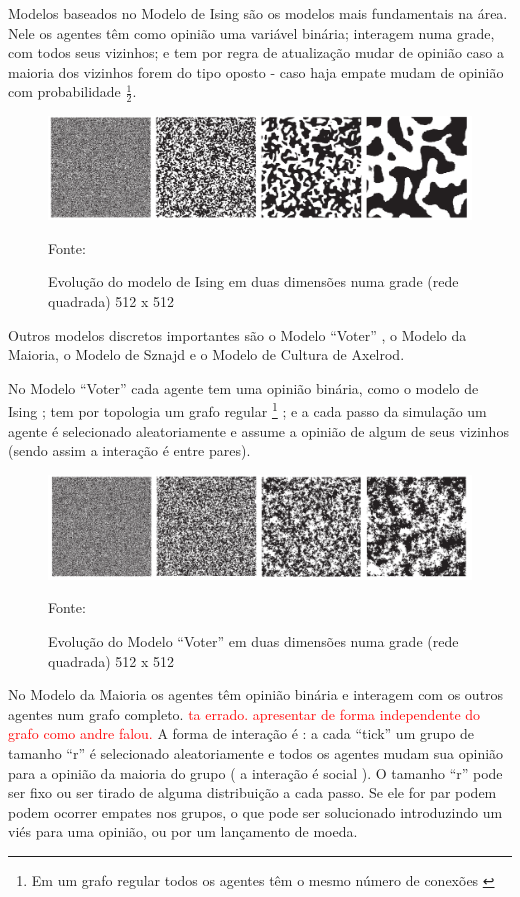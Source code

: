 \quad \quad Modelos baseados no Modelo de Ising são os modelos mais fundamentais na
área. Nele os agentes têm como opinião uma variável binária; interagem numa
grade, com todos seus vizinhos; e tem por regra de atualização mudar de opinião
caso a maioria dos vizinhos forem do tipo oposto - caso haja empate mudam de
opinião com probabilidade $\frac{1}{2}$. 


\begin{figure}[H]
  \centering \includegraphics[scale = 0.5]{ims/ising.png}
  \caption{Evolução do modelo de Ising em duas dimensões numa grade (rede quadrada)
    512 x 512}
  Fonte: 
\end{figure}


Outros modelos discretos importantes são o Modelo ``Voter'' , o Modelo da
Maioria, o Modelo de Sznajd e o Modelo de Cultura de Axelrod.

No Modelo ``Voter'' cada agente tem uma opinião binária, como o modelo de Ising
; tem por topologia um grafo regular \footnote{Em um grafo regular todos os
  agentes têm o mesmo número de conexões \cite{sayama2015introduction}} ; e a
cada passo da simulação um agente é selecionado aleatoriamente e assume a
opinião de algum de seus vizinhos (sendo assim a interação é entre pares).

\begin{figure}[H]
  \centering \includegraphics[scale = 0.5]{ims/voter.png}
  \caption{Evolução do Modelo ``Voter'' em duas dimensões numa grade (rede quadrada)
    512 x 512}
  Fonte: 
\end{figure}



No Modelo da Maioria os agentes têm opinião binária e interagem com os outros
agentes num grafo completo. \textcolor{red}{ta errado. apresentar de forma
  independente do grafo como andre falou.} A forma de interação é : a cada
``tick'' um grupo de tamanho ``r'' é selecionado aleatoriamente e todos os
agentes mudam sua opinião para a opinião da maioria do grupo ( a interação é
social ). O tamanho ``r'' pode ser fixo ou ser tirado de alguma distribuição a
cada passo. Se ele for par podem podem ocorrer empates nos grupos, o que pode
ser solucionado introduzindo um viés para uma opinião, ou por um lançamento de
moeda.

